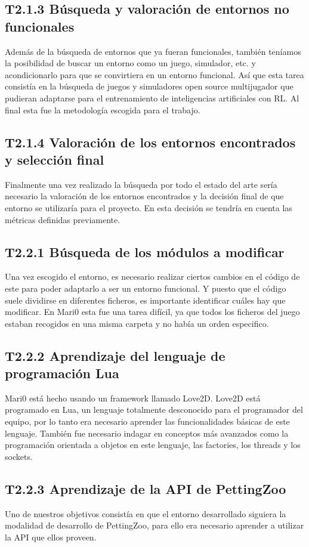 \subsection*{T2.1.3 Búsqueda y valoración de entornos no funcionales}
Además de la búsqueda de entornos que ya fueran funcionales, también teníamos la posibilidad de buscar un entorno como un juego, simulador, etc. y acondicionarlo para que se convirtiera en un entorno funcional. Así que esta tarea consistía en la búsqueda de juegos y simuladores open source multijugador que pudieran adaptarse para el entrenamiento de inteligencias artificiales con RL. Al final esta fue la metodología escogida para el trabajo.

\subsection*{T2.1.4 Valoración de los entornos encontrados y selección final}
Finalmente una vez realizado la búsqueda por todo el estado del arte sería necesario la valoración de los entornos encontrados y la decisión final de que entorno se utilizaría para el proyecto. En esta decisión se tendría en cuenta las métricas definidas previamente.

\subsection*{T2.2.1 Búsqueda de los módulos a modificar}
Una vez escogido el entorno, es necesario realizar ciertos cambios en el código de este para poder adaptarlo a ser un entorno funcional. Y puesto que el código suele dividirse en diferentes ficheros, es importante identificar cuáles hay que modificar. En Mari0 esta fue una tarea difícil, ya que todos los ficheros del juego estaban recogidos en una misma carpeta y no había un orden especifico.

\subsection*{T2.2.2 Aprendizaje del lenguaje de programación Lua}
Mari0 está hecho usando un framework llamado Love2D. Love2D está programado en Lua, un lenguaje totalmente desconocido para el programador del equipo, por lo tanto era necesario aprender las funcionalidades básicas de este lenguaje. También fue necesario indagar en conceptos más avanzados como la programación orientada a objetos en este lenguaje, las factories, los threads y los sockets.

\subsection*{T2.2.3 Aprendizaje de la API de PettingZoo}
Uno de nuestros objetivos consistía en que el entorno desarrollado siguiera la modalidad de desarrollo de PettingZoo, para ello era necesario aprender a utilizar la API que ellos proveen.

